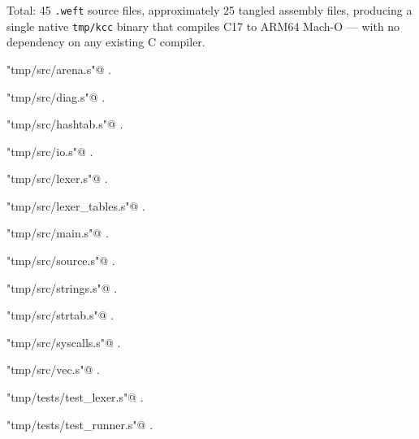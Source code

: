 \documentclass[11pt,a4paper,twoside,openright,DIV=15]{scrbook}
\theoremstyle{definition}
\theoremstyle{plain}
\theoremstyle{remark}
\begin{document}
Total: 45 \texttt{.weft} source files, approximately 25 tangled
assembly files, producing a single native \texttt{tmp/kcc} binary
that compiles C17 to ARM64 Mach-O --- with no dependency on any
existing C compiler.


{\small\begin{list}{}{\setlength{\itemsep}{-\parsep}\setlength{\itemindent}{-\leftmargin}}
\item \verb@"tmp/src/arena.s"@ {\footnotesize {\NWtxtDefBy} .}
\item \verb@"tmp/src/diag.s"@ {\footnotesize {\NWtxtDefBy} .}
\item \verb@"tmp/src/hashtab.s"@ {\footnotesize {\NWtxtDefBy} .}
\item \verb@"tmp/src/io.s"@ {\footnotesize {\NWtxtDefBy} .}
\item \verb@"tmp/src/lexer.s"@ {\footnotesize {\NWtxtDefBy} .}
\item \verb@"tmp/src/lexer_tables.s"@ {\footnotesize {\NWtxtDefBy} .}
\item \verb@"tmp/src/main.s"@ {\footnotesize {\NWtxtDefBy} .}
\item \verb@"tmp/src/source.s"@ {\footnotesize {\NWtxtDefBy} .}
\item \verb@"tmp/src/strings.s"@ {\footnotesize {\NWtxtDefBy} .}
\item \verb@"tmp/src/strtab.s"@ {\footnotesize {\NWtxtDefBy} .}
\item \verb@"tmp/src/syscalls.s"@ {\footnotesize {\NWtxtDefBy} .}
\item \verb@"tmp/src/vec.s"@ {\footnotesize {\NWtxtDefBy} .}
\item \verb@"tmp/tests/test_lexer.s"@ {\footnotesize {\NWtxtDefBy} .}
\item \verb@"tmp/tests/test_runner.s"@ {\footnotesize {\NWtxtDefBy} .}
\end{list}}
\end{document}
